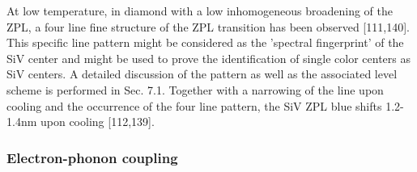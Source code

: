       At low temperature, in diamond with a low inhomogeneous broadening of the ZPL, a four line fine structure of the ZPL transition has been observed [111,140]. This specific line pattern might be considered as the ’spectral fingerprint’ of the SiV center and might be used to prove the identification of single color centers as SiV centers. A detailed discussion of the pattern as well as the associated level scheme is performed in Sec. 7.1. Together with a narrowing of the line upon cooling and the occurrence of the four line pattern, the SiV ZPL blue shifts 1.2-1.4nm upon cooling [112,139].

    \subsubsection{Electron-phonon coupling}

